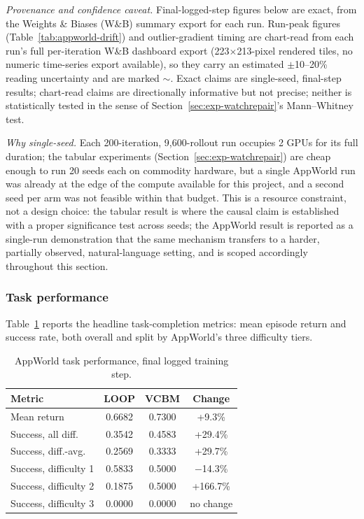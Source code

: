 \documentclass[conference]{IEEEtran}
\begin{document}
\emph{Provenance and confidence caveat.} Final-logged-step figures below are exact, from the Weights \& Biases (W\&B) summary export for each run. Run-peak figures (Table~\ref{tab:appworld-drift}) and outlier-gradient timing are chart-read from each run's full per-iteration W\&B dashboard export (223$\times$213-pixel rendered tiles, no numeric time-series export available), so they carry an estimated $\pm$10--20\% reading uncertainty and are marked $\sim$. Exact claims are single-seed, final-step results; chart-read claims are directionally informative but not precise; neither is statistically tested in the sense of Section~\ref{sec:exp-watchrepair}'s Mann--Whitney test.

\emph{Why single-seed.} Each 200-iteration, 9{,}600-rollout run occupies 2 GPUs for its full duration; the tabular experiments (Section~\ref{sec:exp-watchrepair}) are cheap enough to run 20 seeds each on commodity hardware, but a single AppWorld run was already at the edge of the compute available for this project, and a second seed per arm was not feasible within that budget. This is a resource constraint, not a design choice: the tabular result is where the causal claim is established with a proper significance test across seeds; the AppWorld result is reported as a single-run demonstration that the same mechanism transfers to a harder, partially observed, natural-language setting, and is scoped accordingly throughout this section.

\subsubsection{Task performance}
Table~\ref{tab:appworld-results} reports the headline task-completion metrics: mean episode return and success rate, both overall and split by AppWorld's three difficulty tiers.

\begin{table}[htbp]
  \centering
  \caption{AppWorld task performance, final logged training step.}
  \label{tab:appworld-results}
  \begin{tabular}{@{}p{2.7cm}ccc@{}}
    \toprule
    \textbf{Metric} & \textbf{LOOP} & \textbf{VCBM} & \textbf{Change} \\
    \midrule
    Mean return             & 0.6682 & 0.7300 & +9.3\%    \\
    Success, all diff.\     & 0.3542 & 0.4583 & +29.4\%   \\
    Success, diff.-avg.\    & 0.2569 & 0.3333 & +29.7\%   \\
    Success, difficulty 1   & 0.5833 & 0.5000 & $-$14.3\% \\
    Success, difficulty 2   & 0.1875 & 0.5000 & +166.7\%  \\
    Success, difficulty 3   & 0.0000 & 0.0000 & no change \\
    \bottomrule
  \end{tabular}
\end{table}
\end{document}
